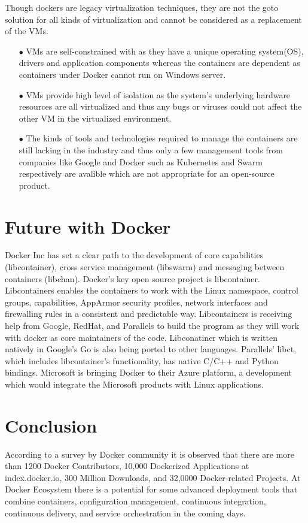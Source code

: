 \documentclass[9pt,twocolumn,twoside]{../../styles/osajnl}
\begin{document}
Though dockers are legacy virtualization techniques, they are not the
goto solution for all kinds of virtualization and cannot be considered
as a replacement of the VMs.
\begin{itemize}
\item[$\bullet$]VMs are self-constrained with as they have a unique
  operating system(OS), drivers and application components whereas the
  containers are dependent as containers under Docker cannot run on
  Windows server.

\item[$\bullet$]VMs provide high level of isolation as the system's
  underlying hardware resources are all virtualized and thus any bugs
  or viruses could not affect the other VM in the virtualized
  environment.

\item[$\bullet$]The kinds of tools and technologies required to manage
  the containers are still lacking in the industry and thus only a few
  management tools from companies like Google and Docker such as
  Kubernetes and Swarm respectively are avalible which are not
  appropriate for an open-source product.
\end{itemize}
\section{Future with Docker}

Docker Inc has set a clear path to the development of core
capabilities (libcontainer), cross service management (libswarm) and
messaging between containers (libchan). Docker's key open source
project is libcontainer. Libcontainers enables the containers to work
with the Linux namespace, control groups, capabilities, AppArmor
security profiles, network interfaces and firewalling rules in a
consistent and predictable way.  Libcontainers is receiving help from
Google, RedHat, and Parallels to build the program as they will work
with docker as core maintainers of the
code\cite{www-docker-1}. Libconatiner which is written natively in
Google's Go is also being ported to other languages. Parallels' libct,
which includes libcontainer's functionality, has native C/C++ and
Python bindings. Microsoft is bringing Docker to their Azure platform,
a development which would integrate the Microsoft products with
Linux applications.



\section{Conclusion}

According to a survey by Docker community it is observed that there
are more than 1200 Docker Contributors, 10,000 Dockerized Applications
at index.docker.io, 300 Million Downloads, and 32,0000 Docker-related
Projects\cite{www-docker-3}. At Docker Ecosystem there is a potential
for some advanced deployment tools that combine containers,
configuration management, continuous integration, continuous delivery,
and service orchestration in the coming days.



\end{document}
